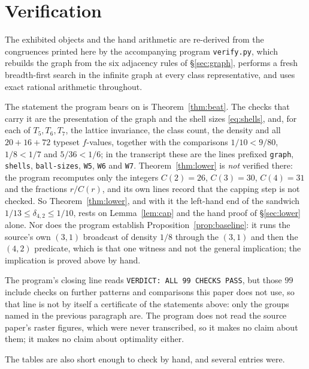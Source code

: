 \documentclass[11pt]{amsart}
\theoremstyle{definition}
\begin{document}
\section*{Verification}

The exhibited objects and the hand arithmetic are re-derived from the congruences printed here by
the accompanying program \texttt{verify.py}, which rebuilds the graph from the six adjacency
rules of \S\ref{sec:graph}, performs a fresh breadth-first search in the infinite graph at every
class representative, and uses exact rational arithmetic throughout.

The statement the program bears on is Theorem~\ref{thm:beat}. The checks that carry it are the
presentation of the graph and the shell sizes \eqref{eq:shells}, and, for each of
$T_5,T_6,T_7$, the lattice invariance, the class count, the density and all $20+16+72$ typeset
$f$-values, together with the comparisons $1/10<9/80$, $1/8<1/7$ and $5/36<1/6$; in the
transcript these are the lines prefixed \texttt{graph}, \texttt{shells}, \texttt{ball-sizes},
\texttt{W5}, \texttt{W6} and \texttt{W7}. Theorem~\ref{thm:lower} is \emph{not} verified there:
the program recomputes only the integers $C(2)=26$, $C(3)=30$, $C(4)=31$ and the fractions
$r/C(r)$, and its own lines record that the capping step is not checked. So
Theorem~\ref{thm:lower}, and with it the left-hand end of the sandwich
$1/13\leq\delta_{4,2}\leq 1/10$, rests on Lemma~\ref{lem:cap} and the hand proof of
\S\ref{sec:lower} alone. Nor does the program establish Proposition~\ref{prop:baseline}: it runs
the source's own $(3,1)$ broadcast of density $1/8$ through the $(3,1)$ and then the $(4,2)$
predicate, which is that one witness and not the general implication; the implication is proved
above by hand.

The program's closing line reads \texttt{VERDICT: ALL 99 CHECKS PASS}, but those $99$ include
checks on further patterns and comparisons this paper does not use, so that line is not by itself
a certificate of the statements above: only the groups named in the previous paragraph are. The
program does not
read the source paper's raster figures, which were never transcribed, so it makes no claim about
them; it makes no claim about optimality either.

The tables are also short enough to check by hand, and several entries were.
\end{document}
